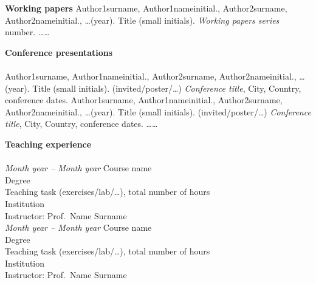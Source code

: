 \documentclass[10pt]{amsart}
\begin{document}
	{\bf Working papers}  \newline
	Author1surname, Author1nameinitial., Author2surname, Author2nameinitial., \ldots    (year). Title (small initials).   {\it Working papers series}  number. \newline\newline
	\newline
	\newline
	\ldots\ldots
	\newline
	\newline
	
	
	{\large {\bf Conference presentations}} \\[-.08cm] 	\underline{\hspace{6in}}\\[.2cm] 
	Author1surname, Author1nameinitial., Author2surname, Author2nameinitial., \ldots    (year). Title (small initials). (invited/poster/\ldots)  {\it Conference title}, City, Country, conference dates.	  \newline
	\newline
	Author1surname, Author1nameinitial., Author2surname, Author2nameinitial., \ldots    (year). Title (small initials). (invited/poster/\ldots)  {\it Conference title}, City, Country, conference dates.	  \newline
	\newline
	\ldots\ldots
	\newline
	\newline
	\clearpage
	
	{\large {\bf Teaching experience}} \\[-.08cm] 
	\underline{\hspace{6in}} \\[.2cm] 
	{\it Month year -- Month year}\newline
	Course name\\
	Degree\\
	Teaching task (exercises/lab/\ldots), total number of hours\\
	Institution\\
	Instructor: Prof.\ Name Surname   \\ 
	
	
	{\it Month year -- Month year}\newline
	Course name\\
	Degree\\
	Teaching task (exercises/lab/\ldots), total number of hours\\
	Institution\\
	Instructor: Prof.\ Name Surname   \\
	
\end{document}
